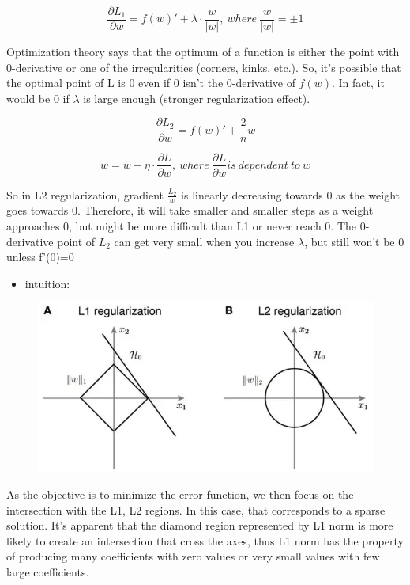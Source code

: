\documentclass[11pt]{article}
\makeatletter
\def\maxwidth{\ifdim\Gin@nat@width>\linewidth\linewidth
    \else\Gin@nat@width\fi}
\let\Oldincludegraphics\includegraphics
\renewcommand{\includegraphics}[1]{\Oldincludegraphics[width=.8\maxwidth]{#1}}
\providecommand{\tightlist}{%
      \setlength{\itemsep}{0pt}\setlength{\parskip}{0pt}}
\makeatother
\begin{document}
\[\frac{\partial L_1}{\partial w} = f(w)' + \lambda \cdot \frac{w}{|w|}, \: where \: \frac{w}{|w|} = \pm 1\]

Optimization theory says that the optimum of a function is either the point with 0-derivative or one of the irregularities (corners, kinks, etc.). So, it's possible that the optimal point of L is 0 even if 0 isn't the 0-derivative of \(f(w)\). In fact, it would be 0 if \(\lambda\) is large enough (stronger regularization effect). 

\[\frac{\partial L_2}{\partial w} = f(w)' + \frac{2}{n} w\]

\[w = w - \eta \cdot \frac{\partial L}{\partial w}, \: where \: \frac{\partial L}{\partial w}  is \: dependent \: to \: w\]

So in L2 regularization, gradient \(\frac{L_2}{w}\) is linearly
decreasing towards 0 as the weight goes towards 0. Therefore, it will
take smaller and smaller steps as a weight approaches 0, but might be
more difficult than L1 or never reach 0.
 The 0-derivative point of \(L_2\) can get very small when you increase \(\lambda\), but still won't be 0 unless  f'(0)=0

\begin{itemize}
\tightlist
\item
  intuition:
\end{itemize}

\begin{figure}[H]
\centering
\includegraphics{l1l2.png}
\caption{}
\end{figure}

As the objective is to minimize the error function,
we then focus on the intersection with the L1, L2
regions.  In this case, that corresponds to a sparse solution. It's apparent that the diamond region represented by L1 norm is
more likely to create an intersection that cross the axes, thus L1 norm has the property of producing many coefficients with zero values or very small values with few large coefficients. 


    
    
    
    
\end{document}
